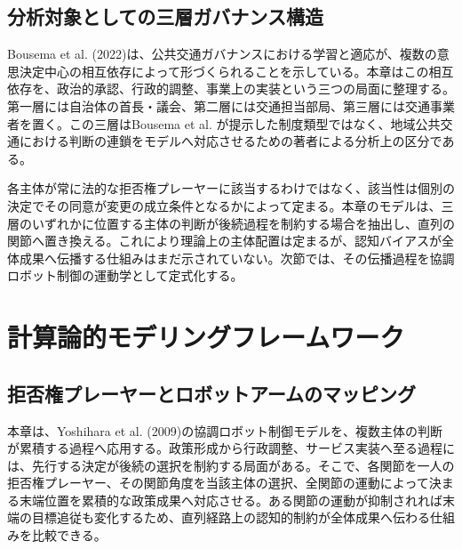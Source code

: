 \subsection{分析対象としての三層ガバナンス構造}

Bousema et al. (2022)は、公共交通ガバナンスにおける学習と適応が、複数の意思決定中心の相互依存によって形づくられることを示している\cite{bousema2022learning}。本章はこの相互依存を、政治的承認、行政的調整、事業上の実装という三つの局面に整理する。第一層には自治体の首長・議会、第二層には交通担当部局、第三層には交通事業者を置く。この三層はBousema et al. が提示した制度類型ではなく、地域公共交通における判断の連鎖をモデルへ対応させるための著者による分析上の区分である。

各主体が常に法的な拒否権プレーヤーに該当するわけではなく、該当性は個別の決定でその同意が変更の成立条件となるかによって定まる。本章のモデルは、三層のいずれかに位置する主体の判断が後続過程を制約する場合を抽出し、直列の関節へ置き換える。これにより理論上の主体配置は定まるが、認知バイアスが全体成果へ伝播する仕組みはまだ示されていない。次節では、その伝播過程を協調ロボット制御の運動学として定式化する。

\section{計算論的モデリングフレームワーク}
\label{sec:ch3_model}

\subsection{拒否権プレーヤーとロボットアームのマッピング}

本章は、Yoshihara et al. (2009)の協調ロボット制御モデルを、複数主体の判断が累積する過程へ応用する\cite{yoshihara2009cooperative}。政策形成から行政調整、サービス実装へ至る過程には、先行する決定が後続の選択を制約する局面がある\cite{goverde2002networks}。そこで、各関節を一人の拒否権プレーヤー、その関節角度を当該主体の選択、全関節の運動によって決まる末端位置を累積的な政策成果へ対応させる。ある関節の運動が抑制されれば末端の目標追従も変化するため、直列経路上の認知的制約が全体成果へ伝わる仕組みを比較できる。


